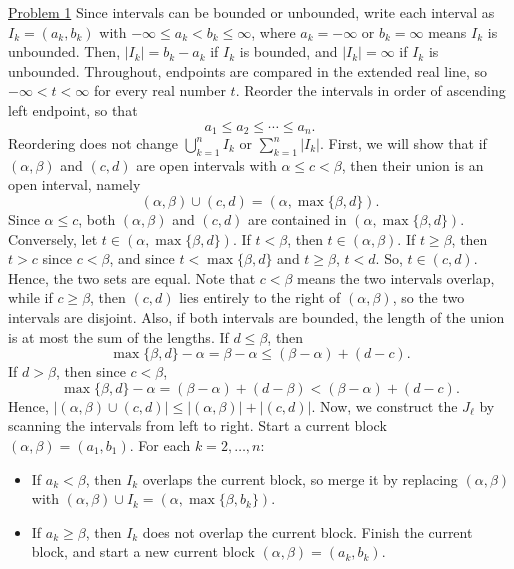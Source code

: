 \documentclass{exam}
\begin{document}
\underline{Problem 1}
\newline
\newline
Since intervals can be bounded or unbounded, write each interval as $I_k=(a_k,b_k)$ with $-\infty\leq a_k<b_k\leq\infty$, where $a_k=-\infty$ or $b_k=\infty$ means $I_k$ is unbounded. Then, $|I_k|=b_k-a_k$ if $I_k$ is bounded, and $|I_k|=\infty$ if $I_k$ is unbounded. Throughout, endpoints are compared in the extended real line, so $-\infty<t<\infty$ for every real number $t$. Reorder the intervals in order of ascending left endpoint, so that
\[
    a_1\leq a_2\leq\cdots\leq a_n.
\]
Reordering does not change $\bigcup_{k=1}^{n}I_k$ or $\sum_{k=1}^{n}|I_k|$.
\newline
\newline
First, we will show that if $(\alpha,\beta)$ and $(c,d)$ are open intervals with $\alpha\leq c<\beta$, then their union is an open interval, namely
\[
    (\alpha,\beta)\cup(c,d)=(\alpha,\max\{\beta,d\}).
\]
Since $\alpha\leq c$, both $(\alpha,\beta)$ and $(c,d)$ are contained in $(\alpha,\max\{\beta,d\})$. Conversely, let $t\in(\alpha,\max\{\beta,d\})$. If $t<\beta$, then $t\in(\alpha,\beta)$. If $t\geq\beta$, then $t>c$ since $c<\beta$, and since $t<\max\{\beta,d\}$ and $t\geq\beta$, $t<d$. So, $t\in(c,d)$. Hence, the two sets are equal. Note that $c<\beta$ means the two intervals overlap, while if $c\geq\beta$, then $(c,d)$ lies entirely to the right of $(\alpha,\beta)$, so the two intervals are disjoint.
\newline
\newline
Also, if both intervals are bounded, the length of the union is at most the sum of the lengths. If $d\leq\beta$, then
\[
    \max\{\beta,d\}-\alpha=\beta-\alpha\leq(\beta-\alpha)+(d-c).
\]
If $d>\beta$, then since $c<\beta$,
\[
    \max\{\beta,d\}-\alpha=(\beta-\alpha)+(d-\beta)<(\beta-\alpha)+(d-c).
\]
Hence, $|(\alpha,\beta)\cup(c,d)|\leq|(\alpha,\beta)|+|(c,d)|$.
\newline
\newline
Now, we construct the $J_\ell$ by scanning the intervals from left to right. Start a current block $(\alpha,\beta)=(a_1,b_1)$. For each $k=2,\ldots,n$:
\begin{itemize}
    \item If $a_k<\beta$, then $I_k$ overlaps the current block, so merge it by replacing $(\alpha,\beta)$ with $(\alpha,\beta)\cup I_k=(\alpha,\max\{\beta,b_k\})$.
    \item If $a_k\geq\beta$, then $I_k$ does not overlap the current block. Finish the current block, and start a new current block $(\alpha,\beta)=(a_k,b_k)$.
\end{itemize}
\end{document}
